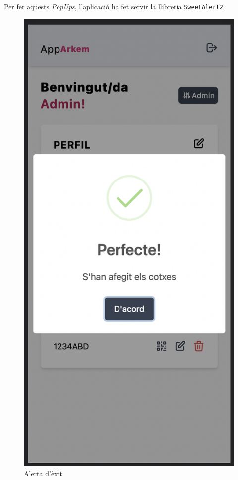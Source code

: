 Per fer aquests \emph{PopUps}, l'aplicació ha fet servir la llibreria \texttt{SweetAlert2} \autocite{sweetalert2}

\begin{figure}[H]
    \begin{center}
        \includegraphics[scale=0.50]{Fotos/pantalla14_bannerCorrecte.png}
    \end{center}
    \caption{Alerta d'èxit}
    \label{fig:exit_alert}
\end{figure}

